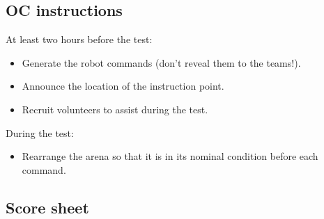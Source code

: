 \subsection*{OC instructions}

At least two hours before the test:
\begin{itemize}
	\item Generate the robot commands (don't reveal them to the teams!).
	\item Announce the location of the instruction point.
	\item Recruit volunteers to assist during the test.
\end{itemize}

\noindent During the test:
\begin{itemize}[nosep]
	\item Rearrange the arena so that it is in its nominal condition before each command.
\end{itemize}

\subsection*{Score sheet}


